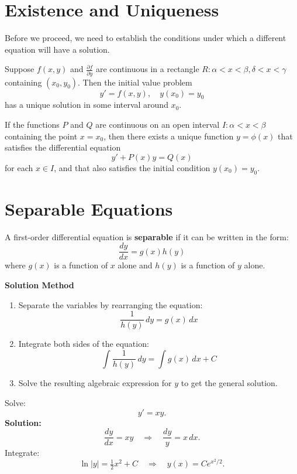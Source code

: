 \section{Existence and Uniqueness}
Before we proceed, we need to establish the conditions under which a different equation will have a solution.
\begin{theorem}
    Suppose $f(x,y)$ and $\frac{\partial f}{\partial y}$ are continuous in a rectangle $R: \alpha < x < \beta, \delta < x < \gamma $ containing \((x_0,y_0)\). Then the initial value problem
    \[
    y' = f(x,y), \quad y(x_0)=y_0
    \]
    has a unique solution in some interval around $x_0$.
\end{theorem}

\begin{theorem}
    If the functions \(P\) and \(Q\) are continuous on an open interval \(I:\alpha < x < \beta\) containing the point \(x=x_0\), then there exists a unique function \(y=\phi(x)\) that satisfies the differential equation
    \begin{equation}
        y' + P(x)y = Q(x)
    \end{equation}
    for each \(x\in I\), and that also satisfies the initial condition \(y(x_0) = y_0\).
\end{theorem}



\section{Separable Equations}
A first-order differential equation is \textbf{separable} if it can be written in the form:
$$ \frac{dy}{dx} = g(x)h(y) $$
where $g(x)$ is a function of $x$ alone and $h(y)$ is a function of $y$ alone.

\textbf{Solution Method}
\begin{enumerate}
    \item Separate the variables by rearranging the equation:
    $$ \frac{1}{h(y)} \, dy = g(x) \, dx $$
    \item Integrate both sides of the equation:
    $$ \int \frac{1}{h(y)} \, dy = \int g(x) \, dx + C $$
    \item Solve the resulting algebraic expression for $y$ to get the general solution.
\end{enumerate}

\begin{example}
Solve:
\[
    y' = xy.
    \]
    \textbf{Solution:}  
    \[
    \frac{dy}{dx} = xy \quad \Rightarrow \quad \frac{dy}{y} = x\,dx.
    \]
    Integrate:
    \[
    \ln|y| = \tfrac{1}{2}x^2 + C \quad \Rightarrow \quad y(x) = Ce^{x^2/2}.
    \]
\end{example}

